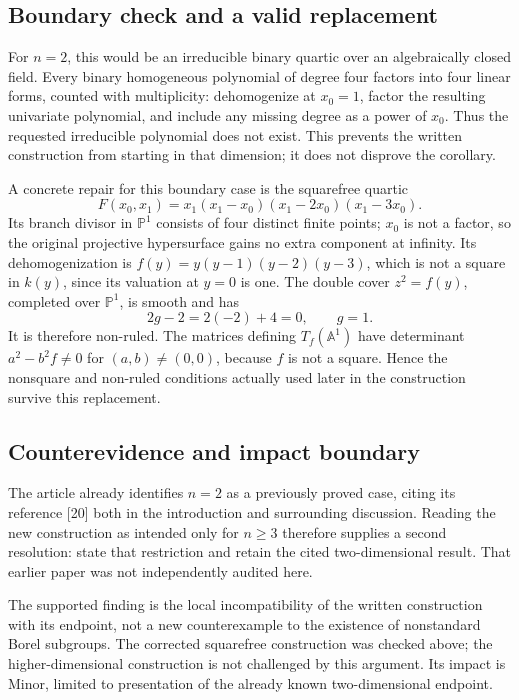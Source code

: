 \documentclass[10pt]{article}
\begin{document}
\subsection*{Boundary check and a valid replacement}
For \(n=2\), this would be an irreducible binary quartic over an algebraically closed field. Every binary homogeneous polynomial of degree four factors into four linear forms, counted with multiplicity: dehomogenize at \(x_0=1\), factor the resulting univariate polynomial, and include any missing degree as a power of \(x_0\). Thus the requested irreducible polynomial does not exist. This prevents the written construction from starting in that dimension; it does not disprove the corollary.\par
A concrete repair for this boundary case is the squarefree quartic \[F(x_0,x_1)=x_1(x_1-x_0)(x_1-2x_0)(x_1-3x_0).\] Its branch divisor in \(\mathbb P^1\) consists of four distinct finite points; \(x_0\) is not a factor, so the original projective hypersurface gains no extra component at infinity. Its dehomogenization is \(f(y)=y(y-1)(y-2)(y-3)\), which is not a square in \(k(y)\), since its valuation at \(y=0\) is one. The double cover \(z^2=f(y)\), completed over \(\mathbb P^1\), is smooth and has \[2g-2=2(-2)+4=0,\qquad g=1.\] It is therefore non-ruled. The matrices defining \(T_f(\mathbb A^1)\) have determinant \(a^2-b^2f\ne0\) for \((a,b)\ne(0,0)\), because \(f\) is not a square. Hence the nonsquare and non-ruled conditions actually used later in the construction survive this replacement.\par
\subsection*{Counterevidence and impact boundary}
The article already identifies \(n=2\) as a previously proved case, citing its reference [20] both in the introduction and surrounding discussion. Reading the new construction as intended only for \(n\ge3\) therefore supplies a second resolution: state that restriction and retain the cited two-dimensional result. That earlier paper was not independently audited here.\par
The supported finding is the local incompatibility of the written construction with its endpoint, not a new counterexample to the existence of nonstandard Borel subgroups. The corrected squarefree construction was checked above; the higher-dimensional construction is not challenged by this argument. Its impact is Minor, limited to presentation of the already known two-dimensional endpoint.\par
\end{document}
